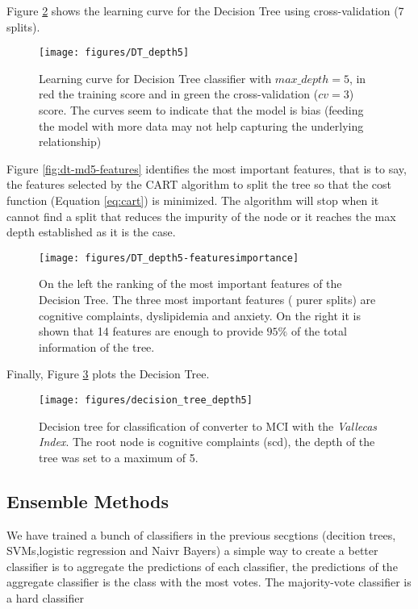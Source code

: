 \documentclass[11pt]{article}
\begin{document}
Figure \ref{fig:dt-md5-learning} shows the learning curve for the Decision Tree using cross-validation (7 splits). 
\begin{figure}[H]
        \centering
        \texttt{[image: figures/DT\_depth5]}
        \caption{Learning curve for Decision Tree classifier with $max\_depth=5$, in red the training score and in green the cross-validation ($cv=3$) score. The curves seem to indicate that the model is bias (feeding the model with more data may not help capturing the underlying relationship)
        }
\label{fig:dt-md5-learning}
\end{figure}

Figure \ref{fig:dt-md5-features} identifies the most important features, that is to say, the features selected by the CART algorithm to split the tree so that the cost function (Equation \ref{eq:cart}) is minimized. The algorithm will stop when it cannot find a split that reduces the impurity of the node or it reaches the max depth established as it is the case.
\begin{figure}[H]
        \centering
        \texttt{[image: figures/DT\_depth5-featuresimportance]}
        \caption{On the left the ranking of the most important features of the Decision Tree. The three most important features ( purer splits) are cognitive complaints, dyslipidemia and anxiety. On the right it is shown that 14 features are enough to provide $95\%$ of the total information of the tree.   
        }
\label{fig:dt-md5-learning}
\end{figure}

Finally, Figure \ref{fig:dt-md5-dot} plots the Decision Tree. 
\begin{figure}[H]
        \centering
        \texttt{[image: figures/decision\_tree\_depth5]}
        \caption{Decision tree for classification of converter to MCI with the \emph{Vallecas Index}. The root node is cognitive complaints (scd), the depth of the tree was set to a maximum of 5.
        }
\label{fig:dt-md5-dot}
\end{figure}


\subsection{Ensemble Methods}
\label{se:resensemble}

We have trained a bunch of classifiers in the previous secgtions (decition trees, SVMs,logistic regression and Naivr Bayers) a simple way to create a better classifier is to aggregate the predictions of each classifier, the predictions of the aggregate classifier is the class with the most votes. The majority-vote classifier is a hard classifier
\end{document}
